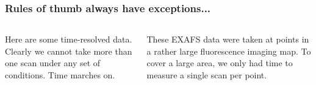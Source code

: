 \documentclass[10pt, xcolor=x11names, compress]{beamer}
\begin{document}
\begin{frame}
  \frametitle{Rules of thumb always have exceptions...}
  \small
  \begin{columns}[T]
    \begin{column}{0.5\linewidth}
      Here are some time-resolved data.  Clearly we cannot take more
      than one scan under any set of conditions. Time marches on.        
    \end{column}
    \begin{column}{0.5\linewidth}
      These EXAFS data were taken at points in a rather large
      fluorescence imaging map.  To cover a large area, we only had time
      to measure a single scan per point.
    \end{column}
  \end{columns}

  \medskip


\end{frame}
\end{document}
